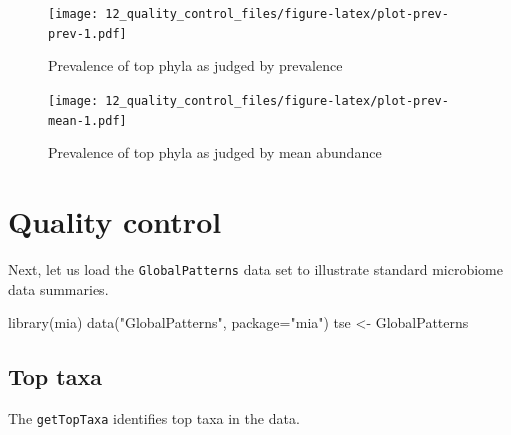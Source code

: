 \documentclass[
]{book}
\newenvironment{Shaded}{\begin{snugshade}}{\end{snugshade}}
\newcommand{\AttributeTok}[1]{\textcolor[rgb]{0.77,0.63,0.00}{#1}}
\newcommand{\FunctionTok}[1]{\textcolor[rgb]{0.00,0.00,0.00}{#1}}
\newcommand{\NormalTok}[1]{#1}
\newcommand{\OtherTok}[1]{\textcolor[rgb]{0.56,0.35,0.01}{#1}}
\newcommand{\SpecialCharTok}[1]{\textcolor[rgb]{0.00,0.00,0.00}{#1}}
\newcommand{\StringTok}[1]{\textcolor[rgb]{0.31,0.60,0.02}{#1}}
\begin{document}
\begin{figure}
\centering
\texttt{[image: 12\_quality\_control\_files/figure-latex/plot-prev-prev-1.pdf]}
\caption{\label{fig:plot-prev-prev}Prevalence of top phyla as judged by prevalence}
\end{figure}

\begin{Shaded}
\end{Shaded}

\begin{figure}
\centering
\texttt{[image: 12\_quality\_control\_files/figure-latex/plot-prev-mean-1.pdf]}
\caption{\label{fig:plot-prev-mean}Prevalence of top phyla as judged by mean abundance}
\end{figure}

\hypertarget{qc}{%
\section{Quality control}\label{qc}}

Next, let us load the \texttt{GlobalPatterns} data set to illustrate standard
microbiome data summaries.

\begin{Shaded}
\begin{Highlighting}[]
\FunctionTok{library}\NormalTok{(mia)}
\FunctionTok{data}\NormalTok{(}\StringTok{"GlobalPatterns"}\NormalTok{, }\AttributeTok{package=}\StringTok{"mia"}\NormalTok{)}
\NormalTok{tse }\OtherTok{\textless{}{-}}\NormalTok{ GlobalPatterns }
\end{Highlighting}
\end{Shaded}

\hypertarget{top-taxa}{%
\subsection{Top taxa}\label{top-taxa}}

The \texttt{getTopTaxa} identifies top taxa in the data.
\end{document}
